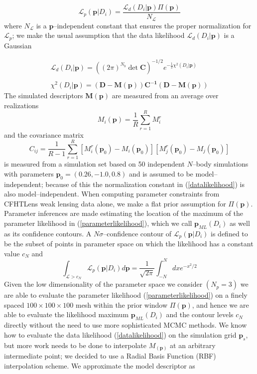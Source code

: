\documentclass[reprint,aps,prd,superscriptaddress,showkeys]{revtex4-1}
\begin{document}
\begin{equation}
\label{parameterlikelihood}
\mathcal{L}_p(\mathbf{p}\vert D_i) = \frac{\mathcal{L}_d(D_i\vert \mathbf{p})\Pi(\mathbf{p})}{N_{\mathcal{L}}}
\end{equation}
%
where $N_{\mathcal{L}}$ is a $\mathbf{p}$--independent constant that ensures the proper normalization for $\mathcal{L}_p$; we make the usual assumption that the data likelihood $\mathcal{L}_d(D_i\vert \mathbf{p})$ is a Gaussian

\begin{equation}
\label{datalikelihood}
\begin{matrix}
\mathcal{L}_d(D_i\vert \mathbf{p}) = ((2\pi)^{N_b}\det{\mathbf{C}})^{-1/2} e^{-\frac{1}{2}\chi^2(D_i\vert \mathbf{p})} \\ \\
\chi^2(D_i\vert \mathbf{p}) = \mathbf{(D - M(p))C^{-1}(D-M(p))}
\end{matrix}
\end{equation} 
%
The simulated descriptors $\mathbf{M(p)}$ are measured from an average over realizations
\begin{equation}
M_i(\mathbf{p}) = \frac{1}{R}\sum_{r=1}^R M_i^r 
\end{equation}
%
and the covariance matrix 
\begin{equation}
C_{ij} = \frac{1}{R-1} \sum_{r=1}^R [M_i^r(\mathbf{p}_0)-M_i(\mathbf{p}_0)][M_j^r(\mathbf{p}_0)-M_j(\mathbf{p}_0)]
\end{equation}
%
is measured from a simulation set based on 50 independent $N$--body simulations with parameters $\mathbf{p}_0=(0.26,-1.0,0.8)$ and is assumed to be model--independent; because of this the normalization constant in (\ref{datalikelihood}) is also model--independent. When computing parameter constraints from CFHTLens weak lensing data alone, we make a flat prior assumption for $\Pi(\mathbf{p})$. Parameter inferences are made estimating the location of the maximum of the parameter likelihood in (\ref{parameterlikelihood}), which we call $\mathbf{p}_{ML}(D_i)$ as well as its confidence contours. A $N\sigma$--confidence contour of $\mathcal{L}_p(\mathbf{p}\vert D_i)$ is defined to be the subset of points in parameter space on which the likelihood has a constant value $c_N$ and 
\begin{equation}
\int_{\mathcal{L}>c_N} \mathcal{L}_p(\mathbf{p}\vert D_i) d\mathbf{p} = \frac{1}{\sqrt{2\pi}}\int_{-N}^N dx e^{-x^2/2}
\end{equation}
%
Given the low dimensionality of the parameter space we consider $(N_p=3)$ we are able to evaluate the parameter likelihood (\ref{parameterlikelihood}) on a finely spaced $100\times100\times100$ mesh within the prior window $\Pi(\mathbf{p})$, and hence we are able to evaluate the likelihood maximum $\mathbf{p}_{ML}(D_i)$ and the contour levels $c_N$ directly without the need to use more sophisticated MCMC methods. We know how to evaluate the data likelihood (\ref{datalikelihood}) on the simulation grid $\mathbf{p}_s$, but more work needs to be done to interpolate $M_(\mathbf{p})$ at an arbitrary intermediate point; we decided to use a Radial Basis Function (RBF) interpolation scheme. We approximate the model descriptor as
\end{document}

